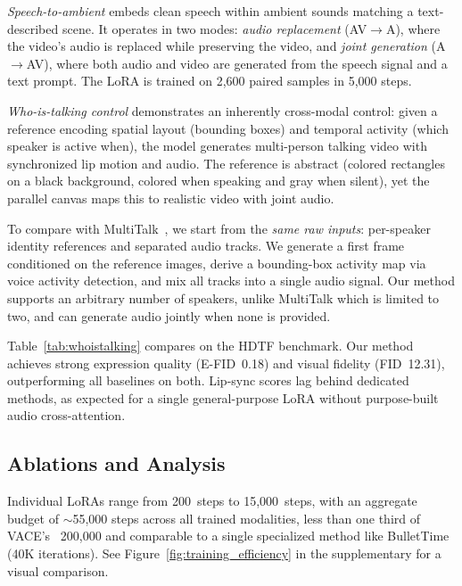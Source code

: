 \emph{Speech-to-ambient} embeds clean speech within ambient sounds matching a text-described scene. It operates in two modes: \emph{audio replacement} (AV$\to$A), where the video's audio is replaced while preserving the video, and \emph{joint generation} (A$\to$AV), where both audio and video are generated from the speech signal and a text prompt. The LoRA is trained on 2{,}600 paired samples in 5{,}000 steps.

\emph{Who-is-talking control} demonstrates an inherently cross-modal control: given a reference encoding spatial layout (bounding boxes) and temporal activity (which speaker is active when), the model generates multi-person talking video with synchronized lip motion and audio. The reference is abstract (colored rectangles on a black background, colored when speaking and gray when silent), yet the parallel canvas maps this to realistic video with joint audio.

To compare with MultiTalk~\cite{kong2025multitalk}, we start from the \emph{same raw inputs}: per-speaker identity references and separated audio tracks. We generate a first frame conditioned on the reference images, derive a bounding-box activity map via voice activity detection, and mix all tracks into a single audio signal. Our method supports an arbitrary number of speakers, unlike MultiTalk which is limited to two, and can generate audio jointly when none is provided.



Table~\ref{tab:whoistalking} compares on the HDTF benchmark. Our method achieves strong expression quality (E-FID~0.18) and visual fidelity (FID~12.31), outperforming all baselines on both. Lip-sync scores lag behind dedicated methods, as expected for a single general-purpose LoRA without purpose-built audio cross-attention.

\subsection{Ablations and Analysis}
\label{sec:efficiency}

Individual LoRAs range from 200~steps to 15{,}000~steps, with an aggregate budget of ${\sim}$55{,}000 steps across all trained modalities, less than one third of VACE's~\cite{jiang2025vace} 200{,}000 and comparable to a single specialized method like BulletTime~\cite{wang2025bullettime} (40K iterations). See Figure~\ref{fig:training_efficiency} in the supplementary for a visual comparison.

